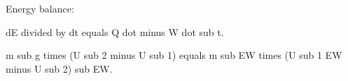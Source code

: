 Energy balance:

dE divided by dt equals Q dot minus W dot sub t.

m sub g times (U sub 2 minus U sub 1) equals m sub EW times (U sub 1 EW minus U sub 2) sub EW.